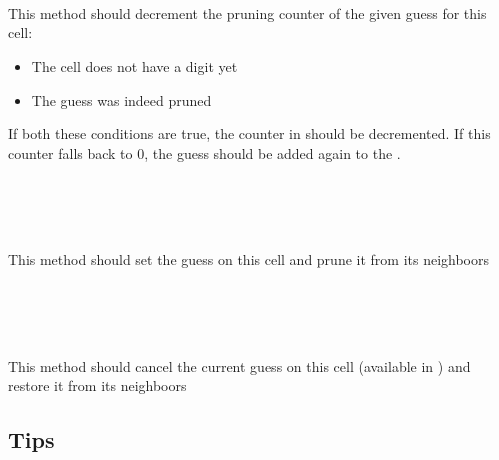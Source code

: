 \documentclass{ecnreport}
\begin{document}
\paragraph{}~\\

 \begin{minipage}{.5cm}
~
 \end{minipage}
 \begin{minipage}{0.9\linewidth}
This method should decrement the pruning counter of the given guess for this cell:

\begin{itemize}
 \item The cell does not have a digit yet
 \item The guess was indeed pruned
\end{itemize}
If both these conditions are true, the counter in  should be decremented. If this counter falls back to 0, the guess should be added again to the .
 \end{minipage}


 \paragraph{}~\\

 \begin{minipage}{.5cm}
~
 \end{minipage}
 \begin{minipage}{0.9\linewidth}
This method should set the guess on this cell and prune it from its neighboors
 \end{minipage}

  \paragraph{}~\\

 \begin{minipage}{.5cm}
~
 \end{minipage}
 \begin{minipage}{0.9\linewidth}
This method should cancel the current guess on this cell (available in ) and restore it from its neighboors
 \end{minipage}

 \subsection{Tips}
\end{document}
